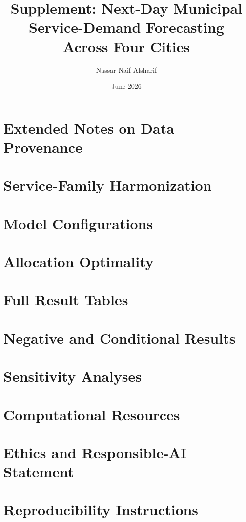 \documentclass[11pt]{article}
\title{Supplement: Next-Day Municipal Service-Demand Forecasting\\Across Four Cities}
\author{Nassar Naif Alsharif}
\date{June 2026}
\begin{document}
\maketitle
\tableofcontents

\section{Extended Notes on Data Provenance}


\section{Service-Family Harmonization}


\section{Model Configurations}


\section{Allocation Optimality}


\section{Full Result Tables}


\section{Negative and Conditional Results}


\section{Sensitivity Analyses}


\section{Computational Resources}\label{ssec:compute}


\section{Ethics and Responsible-AI Statement}


\section{Reproducibility Instructions}




\end{document}
